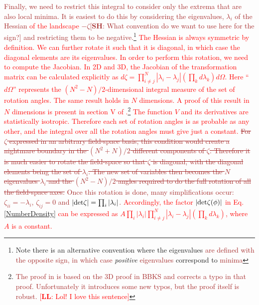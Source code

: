 \documentclass[12pt]{article}
\newcommand{\lfl}[1]{\textcolor{red}{[{\bf LL}: #1]}}
\newcommand{\SH}[1]{\textcolor{brown}{[{\bf SH}: #1]}}
\newcommand{\sh}[1]{\textcolor{brown}{#1}}
\newcommand{\LFL}[1]{\textcolor{red}{#1}}
\begin{document}
\sh{Finally, we need to restrict this integral to consider only the extrema that are also local minima. It is easiest to do this by considering the eigenvalues, $\lambda_i$ of the Hessian \LFL{of the landscape} $-\zeta$\SH{What convention do we want to use here for the sign?} and restricting them to be negative.\footnote{Note there is an alternative convention where the eigenvalues \sh{are defined with the opposite sign, in which case} \emph{positive} \sh{eigenvalues} correspond to \sh{minima}} \LFL{The Hessian is always symmetric by definition. We can further rotate it such that it is diagonal, in which case the diagonal elements are its eigenvalues. In order to perform this rotation, we need to compute the Jacobian. In 2D and 3D, the Jacobian of the transformation matrix can be calculated explicitly as $d \zeta = \prod_{i \neq j}^N |\lambda_i - \lambda_j|(\prod_k d\lambda_k) d \Omega$. Here ``$d\Omega$'' represents the $(N^2-N)/2$-dimensional integral measure of the set of rotation angles. The same result holds in $N$ dimensions. A proof of this result in $N$ dimensions is present in section V of \cite{Easther2016}.\footnote{\sh{The proof in \cite{Easther2016} is based on the 3D proof in BBKS and corrects a typo in that proof. Unfortunately it introduces some new typos, but the proof itself is robust. \lfl{Lol! I love this sentence}}} The function $V$ and its derivatives are statistically isotropic. Therefore each set of rotation angles is as probable as any other, \LFL{and} the integral over all the rotation angles must give just a constant.} \sout{For $\zeta$ expressed in an arbitrary field-space basis, this condition would create a nightmare boundary in the $(N^2+N)/2$ different components of $\zeta$. Therefore it is much easier to rotate the field-space so that $\zeta$ is diagonal, with the diagonal elements being the set of $\lambda_i$. The new set of variables then becomes the $N$ eigenvalues $\lambda_i$ and the $(N^2-N)/2$ angles required to do the full rotation of all the field-space axes.} Once this rotation is done, many simplifications occur: $\zeta_{ii}=-\lambda_i$, $\zeta_{ij}=0$ and $|{\rm det} \zeta| = \prod_i |\lambda_i|$.} \LFL{Accordingly, the factor $|\rm{det} \zeta(\phi)|$ in Eq. \ref{NumberDensity} can be expressed as $A \prod_i |\lambda_i| \prod_{i \neq j}^N |\lambda_i - \lambda_j|(\prod_k d\lambda_k)$, where $A$ is a constant.}
\end{document}
